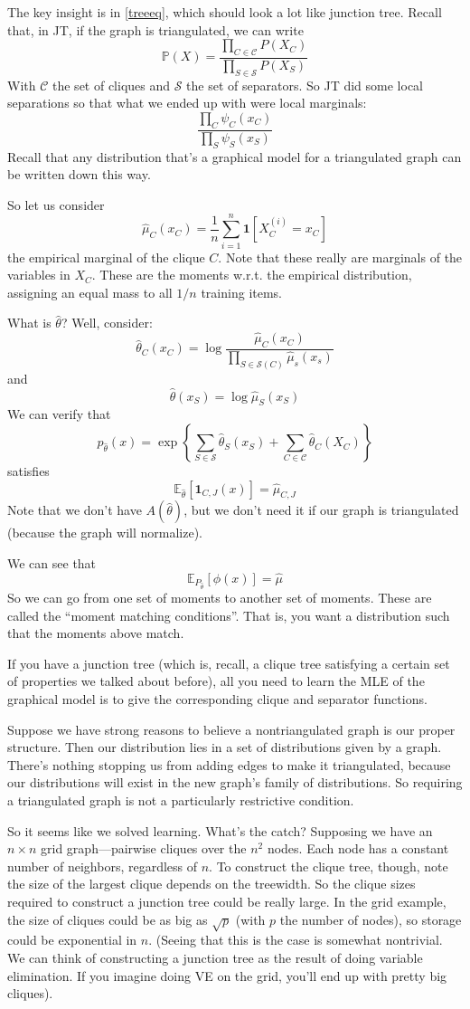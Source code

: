 \documentclass{article}
\newcommand{\E}{\mathbb{E}}
\begin{document}
The key insight is in \eqref{treeeq}, which should look a lot like junction tree.
Recall that, in JT, if the graph is triangulated, we can write
$$
\mathbb P(X) = 
\frac{\prod_{C\in\mathcal C} P(X_C)}
{\prod_{S\in\mathcal S} P(X_S)}
$$
With $\mathcal C$ the set of cliques and $\mathcal S$ the set of separators.
So JT did some local separations so that what we ended up with were local marginals:
$$
\frac{\prod_C \psi_C(x_C)}
{\prod_S \psi_S(x_S)}
$$
Recall that any distribution that's a graphical model for a triangulated graph can be written down this way.

So let us consider
$$
\hat\mu_C(x_C) =
\frac{1}{n}
\sum_{i=1}^n \mathbf 1[X_C^{(i)} = x_C]
$$
the empirical marginal of the clique $C$.
Note that these really are marginals of the variables in $X_C$.
These are the moments w.r.t. the empirical distribution, assigning an equal mass to all $1/n$ training items.

What is $\hat\theta$?
Well, consider:
$$
\hat\theta_C (x_C) =
\log \frac{\hat\mu_C(x_C)}
{ \prod_{S\in \mathcal S(C)} \hat\mu_s(x_s)}
$$
and
$$
\hat\theta(x_S) = 
\log \hat\mu_S(x_S)
$$
We can verify that
$$
p_{\hat\theta}(x) = 
\exp\left\{
\sum_{S\in\mathcal S} \hat\theta_S(x_S) +
\sum_{C\in\mathcal C} \hat\theta_C (X_C)
\right\}
$$
satisfies
$$
\E_{\hat\theta}[\mathbf 1_{C,J}(x)]
=
\hat\mu_{C,J}
$$
Note that we don't have $A(\hat\theta)$, but we don't need it if our graph is triangulated (because the graph will normalize).

We can see that
$$
\E_{P_{\hat\theta}}[\phi(x)]
=
\hat\mu
$$
So we can go from one set of moments to another set of moments.
These are called the ``moment matching conditions''.
That is, you want a distribution such that the moments above match.

If you have a junction tree (which is, recall, a clique tree satisfying a certain set of properties we talked about before), all you need to learn the MLE of the graphical model is to give the corresponding clique and separator functions.

Suppose we have strong reasons to believe a nontriangulated graph is our proper structure.
Then our distribution lies in a set of distributions given by a graph.
There's nothing stopping us from adding edges to make it triangulated, because our distributions will exist in the new graph's family of distributions.
So requiring a triangulated graph is not a particularly restrictive condition.

So it seems like we solved learning.
What's the catch?
Supposing we have an $n\times n$ grid graph---pairwise cliques over the $n^2$ nodes.
Each node has a constant number of neighbors, regardless of $n$.
To construct the clique tree, though, note the size of the largest clique depends on the treewidth.
So the clique sizes required to construct a junction tree could be really large.
In the grid example, the size of cliques could be as big as $\sqrt p$ (with $p$ the number of nodes), so storage could be exponential in $n$.
(Seeing that this is the case is somewhat nontrivial. We can think of constructing a junction tree as the result of doing variable elimination.
If you imagine doing VE on the grid, you'll end up with pretty big cliques).
\end{document}
